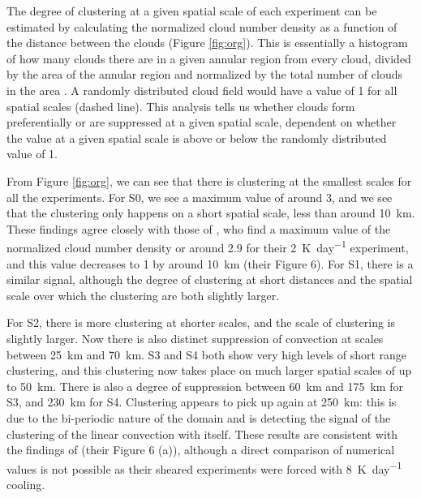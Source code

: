 \documentclass[11pt,a4paper]{article}
\begin{document}
The degree of clustering at a given spatial scale of each experiment can be estimated by calculating the normalized cloud number density as a function of the distance between the clouds (Figure \ref{fig:org}). This is essentially a histogram of how many clouds there are in a given annular region from every cloud, divided by the area of the annular region and normalized by the total number of clouds in the area \parencite{CC2006II}. A randomly distributed cloud field would have a value of 1 for all spatial scales (dashed line). This analysis tells us whether clouds form preferentially or are suppressed at a given spatial scale, dependent on whether the value at a given spatial scale is above or below the randomly distributed value of 1.

From Figure \ref{fig:org}, we can see that there is clustering at the smallest scales for all the experiments. For S0, we see a maximum value of around 3, and we see that the clustering only happens on a short spatial scale, less than around \SI{10}{km}. These findings agree closely with those of \cite{CC2006II}, who find a maximum value of the normalized cloud number density or around 2.9 for their \SI{2}{K.day^{-1}} experiment, and this value decreases to 1 by around \SI{10}{km} (their Figure 6). For S1, there is a similar signal, although the degree of clustering at short distances and the spatial scale over which the clustering are both slightly larger. 

For S2, there is more clustering at shorter scales, and the scale of clustering is slightly larger. Now there is also distinct suppression of convection at scales between \SI{25}{km} and \SI{70}{km}. S3 and S4 both show very high levels of short range clustering, and this clustering now takes place on much larger spatial scales of up to \SI{50}{km}. There is also a degree of suppression between \SI{60}{km} and \SI{175}{km} for S3, and \SI{230}{km} for S4. Clustering appears to pick up again at \SI{250}{km}: this is due to the bi-periodic nature of the domain and is detecting the signal of the clustering of the linear convection with itself. These results are consistent with the findings of \cite{CC2006II} (their Figure 6 (a)), although a direct comparison of numerical values is not possible as their sheared experiments were forced with \SI{8}{K.day^{-1}} cooling.
\end{document}
